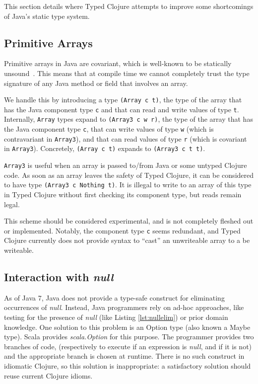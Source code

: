 This section details where Typed Clojure attempts to improve some shortcomings of Java's static type system.

\subsection{Primitive Arrays}
\label{designarrays}

Primitive arrays in Java are covariant, which is well-known to be statically unsound~\cite{OW97,BK99}.
This means that at compile time we cannot completely trust the type signature of any Java method or field that involves 
an array.

We handle this by introducing a type \lstinline|(Array c t)|, 
the type of the array that has the Java component type \lstinline|c| 
and that can read and write values of type \lstinline|t|.
Internally, \lstinline|Array| types expand to \lstinline|(Array3 c w r)|,
the type of the array that has the Java component type \lstinline|c|,
that can write values of type \lstinline|w| (which is contravariant in \lstinline|Array3|), 
and that can read values of type \lstinline|r| (which is covariant in \lstinline|Array3|).
Concretely, \lstinline|(Array c t)| expands to \lstinline|(Array3 c t t)|.

\lstinline|Array3| is useful when an array is passed to/from Java or some untyped Clojure code.
As soon as an array leaves the safety of Typed Clojure, it can be considered to have type
\lstinline|(Array3 c Nothing t)|. It is illegal to write to an array of this type in Typed Clojure
without first checking its component type, but reads remain legal.

This scheme should be considered experimental, and is not completely fleshed out or implemented.
Notably, the component type \lstinline|c| seems redundant, and Typed Clojure currently
does not provide syntax to ``cast'' an unwriteable array to a be writeable.

\subsection{Interaction with \emph{null}}
\label{sec:interactionnull}

As of Java 7, Java does not provide a type-safe construct for eliminating
occurrences of \emph{null}. Instead, Java programmers rely on ad-hoc approaches,
like testing for the presence of \emph{null} (like Listing \ref{lst:nullelim}) or prior domain knowledge.
One solution to this problem is an Option type (also known a Maybe type).
Scala provides \emph{scala.Option} for this purpose. The programmer provides two branches of code,
(respectively to execute if an expression is \emph{null}, and if it is not)
and the appropriate branch is chosen at runtime.
There is no such construct in idiomatic Clojure, so this solution is inappropriate:
a satisfactory solution should reuse current Clojure idioms.

